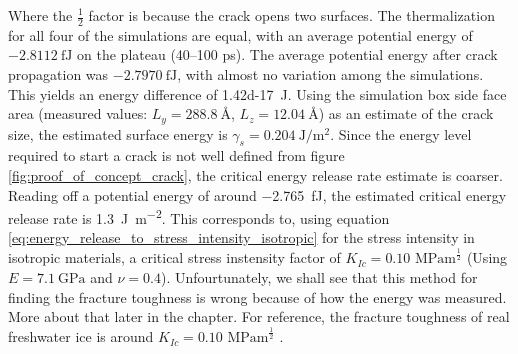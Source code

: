 Where the $\frac{1}{2}$ factor is because the crack opens two surfaces. The thermalization for all four of the simulations are equal, with an average potential energy of $\SI{-2.8112}{\femto\joule}$ on the plateau (40--100 \si{\pico\second}). The average potential energy after crack propagation was $\SI{-2.7970}{\femto\joule}$, with almost no variation among the simulations. This yields an energy difference of \SI{1.42d-17}{\joule}. Using the simulation box side face area (measured values: $L_y = \SI{288.8}{\angstrom}$, $L_z = \SI{12.04}{\angstrom}$) as an estimate of the crack size, the estimated surface energy is $\gamma_s = \SI{0.204}{\joule\per\meter\squared}$. Since the energy level required to start a crack is not well defined from figure \ref{fig:proof_of_concept_crack}, the critical energy release rate estimate is coarser. Reading off a potential energy of around \SI{-2.765}{\femto\joule}, the estimated critical energy release rate is \SI{1.3}{\joule\per\meter\squared}. This corresponds to, using equation \ref{eq:energy_release_to_stress_intensity_isotropic} for the stress intensity in isotropic materials, a critical stress instensity factor of $K_{Ic} = 0.10 \text{ MPam}^{\frac{1}{2}}$ (Using $E=\SI{7.1}{\giga\pascal}$ and $\nu = 0.4$). Unfourtunately, we shall see that this method for finding the fracture toughness is wrong because of how the energy was measured. More about that later in the chapter. For reference, the fracture toughness of real freshwater ice is around $K_{Ic} = 0.10 \text{ MPam}^{\frac{1}{2}}$ \cite{benham1996mechanics}. 

